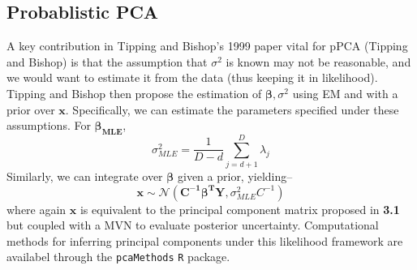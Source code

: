 \documentclass[english, 11pt]{article}\usepackage[]{graphicx}\usepackage[]{color}
\begin{document}
\subsection{Probablistic PCA}

A key contribution in Tipping and Bishop's 1999 paper \cite{tipping1999probabilistic} vital for pPCA (Tipping and Bishop) is that the assumption that $\sigma^2$ is known may not be reasonable, and we would want to estimate it from the data (thus keeping it in likelihood). Tipping and Bishop then propose the estimation of $\mathbf{\beta}, \sigma^2$ using EM and with a prior over $\mathbf{x}$.
\newline \newline
Specifically, we can estimate the parameters specified under these assumptions. For $\mathbf{\beta_{\textrm{MLE}}}$, $$\sigma_{MLE}^2 = \frac{1}{D-d} \sum_{j = d +1}^D \lambda_j $$
Similarly, we can integrate over $\mathbf{\beta}$ given a prior, yielding--
$$  \mathbf{x} \sim  \mathcal{N} (\mathbf{C^{-1}\beta^{T}Y}, \sigma_{MLE}^2C^{-1})$$
where again $\mathbf{x}$ is equivalent to the principal component matrix proposed in \textbf{3.1} but coupled with a MVN to evaluate posterior uncertainty.\newline \newline
\noindent Computational methods for inferring principal components under this likelihood framework are availabel through the \texttt{pcaMethods} \texttt{R} package.
\end{document}
